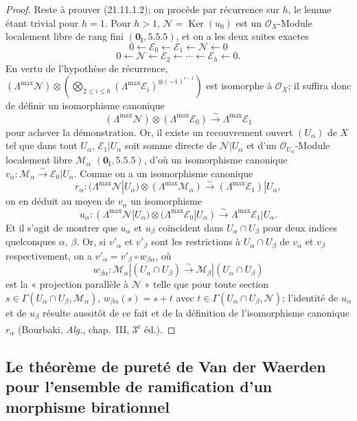 \begin{proof}
Reste à prouver (21.11.1.2); on procède par récurrence sur $h$, le lemme étant trivial
pour $h=1$. Pour $h>1$, $\mathscr N=\operatorname{Ker}(u_0)$ est un
$\mathcal O_X$-Module localement libre de rang fini $(\mathbf 0_{\mathrm I}, 5.5.5)$,
et on a les deux suites exactes
\[
  0\leftarrow\mathscr E_0\leftarrow\mathscr E_1
  \leftarrow\mathscr N\leftarrow0
\]
\[
  0\leftarrow\mathscr N\leftarrow\mathscr E_2
  \leftarrow\cdots\leftarrow\mathscr E_h\leftarrow0.
\]
En vertu de l'hypothèse de récurrence,
$(\Lambda^{\max}\mathscr N)\otimes
(\bigotimes_{2\leq i\leq h}(\Lambda^{\max}\mathscr E_i)^{\otimes(-1)^{i-1}})$
est isomorphe à $\mathcal O_X$; il suffira donc de définir un isomorphisme canonique
\[
  (\Lambda^{\max}\mathscr N)\otimes(\Lambda^{\max}\mathscr E_0)
  \xrightarrow{\sim}\Lambda^{\max}\mathscr E_1
\]
pour achever la démonstration. Or, il existe un recouvrement ouvert $(U_\alpha)$ de
$X$ tel que dans tout $U_\alpha$, $\mathscr E_1|U_\alpha$ soit somme directe de
$\mathscr N|U_\alpha$ et d'un $\mathcal O_{U_\alpha}$-Module localement libre
$\mathscr M_\alpha$ $(\mathbf 0_{\mathrm I}, 5.5.5)$, d'où un isomorphisme canonique
$v_\alpha:\mathscr M_\alpha\xrightarrow{\sim}\mathscr E_0|U_\alpha$.
Comme on a un isomorphisme canonique
\[
  r_\alpha:(\Lambda^{\max}\mathscr N|U_\alpha)
  \otimes(\Lambda^{\max}\mathscr M_\alpha)
  \xrightarrow{\sim}(\Lambda^{\max}\mathscr E_1)|U_\alpha,
\]
on en déduit au moyen de $v_\alpha$ un isomorphisme
\[
  u_\alpha:(\Lambda^{\max}\mathscr N|U_\alpha)
  \otimes(\Lambda^{\max}\mathscr E_0|U_\alpha)
  \xrightarrow{\sim}\Lambda^{\max}\mathscr E_1|U_\alpha.
\]
Et il s'agit de montrer que $u_\alpha$ et $u_\beta$ coïncident dans
$U_\alpha\cap U_\beta$ pour deux indices quelconques $\alpha$, $\beta$. Or, si
$v'_\alpha$ et $v'_\beta$ sont les restrictions à $U_\alpha\cap U_\beta$ de
$v_\alpha$ et $v_\beta$ respectivement, on a
$v'_\alpha=v'_\beta\circ w_{\beta\alpha}$, où
\[
  w_{\beta\alpha}:\mathscr M_\alpha|(U_\alpha\cap U_\beta)
  \xrightarrow{\sim}\mathscr M_\beta|(U_\alpha\cap U_\beta)
\]
est la « projection parallèle à $\mathscr N$ » telle que pour toute section
$s\in\Gamma(U_\alpha\cap U_\beta,\mathscr M_\alpha)$,
$w_{\beta\alpha}(s)=s+t$ avec
$t\in\Gamma(U_\alpha\cap U_\beta,\mathscr N)$; l'identité de $u_\alpha$ et de
$u_\beta$ résulte aussitôt de ce fait et de la définition de l'isomorphisme canonique
$r_\alpha$ (Bourbaki, \emph{Alg.}, chap.~III, 3\textsuperscript{e} éd.).
\end{proof}

\subsection{Le théorème de pureté de Van der Waerden pour l'ensemble de
ramification d'un morphisme birationnel}
\label{subsection:IV.21.12}
\label{IV.21.12}

